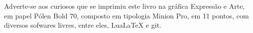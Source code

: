 
\pagebreak

\ifodd\thepage\blankpage\fi

\parindent=0pt
\footnotesize\thispagestyle{empty}

\newfontfamily{}

\mbox{}\vfill
\begin{center}
		\begin{minipage}{.7\textwidth}\tiny\noindent{}
		\centering\tiny\minion
		Adverte-se aos curiosos que se imprimiu este 
		livro na gráfica Expressão e Arte, em papel Pólen Bold 70, composto em tipologia Minion Pro, em 11 pontos, com diversos sofwares livres, 
		entre eles, {Lua\LaTeX} e git.\\ 
		\medskip\\\
		\end{minipage}
\end{center}